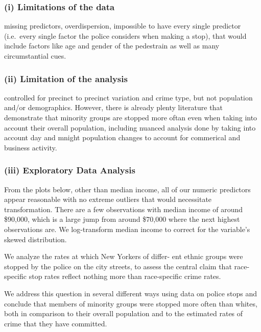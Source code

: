 \documentclass[]{article}
\begin{document}
\hypertarget{i-limitations-of-the-data}{%
\subsubsection{(i) Limitations of the
data}\label{i-limitations-of-the-data}}

missing predictors, overdispersion, impossible to have every single
predictor (i.e.~every single factor the police considers when making a
stop), that would include factors like age and gender of the pedestrain
as well as many circumstantial cues.

\hypertarget{ii-limitation-of-the-analysis}{%
\subsubsection{(ii) Limitation of the
analysis}\label{ii-limitation-of-the-analysis}}

controlled for precinct to precinct variation and crime type, but not
population and/or demographics. However, there is already plenty
literature that demonstrate that minority groups are stopped more oftan
even when taking into account their overall population, including
nuanced analysis done by taking into account day and mnight population
changes to account for commerical and business activity.

\hypertarget{iii-exploratory-data-analysis}{%
\subsubsection{(iii) Exploratory Data
Analysis}\label{iii-exploratory-data-analysis}}

From the plots below, other than median income, all of our numeric
predictors appear reasonable with no extreme outliers that would
necessitate transformation. There are a few observations with median
income of around \$90,000, which is a large jump from around \$70,000
where the next highest observations are. We log-transform median income
to correct for the variable's skewed distribution.

We analyze the rates at which New Yorkers of differ- ent ethnic groups
were stopped by the police on the city streets, to assess the central
claim that race-specific stop rates reflect nothing more than
race-specific crime rates.

We address this question in several different ways using data on police
stops and conclude that members of minority groups were stopped more
often than whites, both in comparison to their overall population and to
the estimated rates of crime that they have committed.
\end{document}
